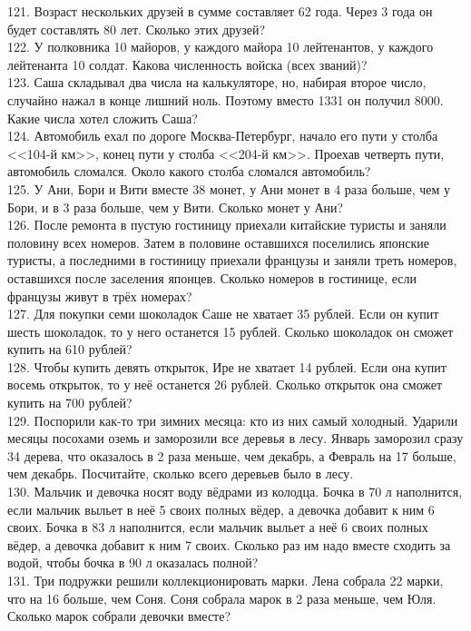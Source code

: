121. Возраст нескольких друзей в сумме составляет 62 года. Через 3 года он будет составлять 80 лет. Сколько этих друзей?\\
122. У полковника 10 майоров, у каждого майора 10 лейтенантов, у каждого лейтенанта 10 солдат. Какова численность войска (всех званий)?\\
123. Саша складывал два числа на калькуляторе, но, набирая второе число, случайно нажал в конце лишний ноль. Поэтому вместо 1331 он получил 8000. Какие числа хотел сложить Саша?\\
124. Автомобиль ехал по дороге Москва-Петербург, начало его пути у столба <<104-й км>>, конец пути у столба <<204-й км>>. Проехав четверть пути, автомобиль сломался. Около какого столба сломался автомобиль?\\
125. У Ани, Бори и Вити вместе 38 монет, у Ани монет в 4 раза больше, чем у Бори, и в 3 раза больше, чем у Вити. Сколько монет у Ани?\\
126. После ремонта в пустую гостиницу приехали китайские туристы и заняли половину всех номеров. Затем в половине оставшихся поселились японские туристы, а последними в гостиницу приехали французы и заняли треть номеров, оставшихся после заселения японцев. Сколько номеров в гостинице, если французы живут в трёх номерах?\\
127. Для покупки семи шоколадок Саше не хватает 35 рублей. Если он купит шесть шоколадок, то у него останется 15 рублей. Сколько шоколадок он сможет купить на 610 рублей?\\
128. Чтобы купить девять открыток, Ире не хватает 14 рублей. Если она купит восемь открыток, то у неё останется 26 рублей. Сколько открыток она сможет купить на 700 рублей?\\
129. Поспорили как-то три зимних месяца: кто из них самый холодный. Ударили месяцы посохами оземь и заморозили все деревья в лесу. Январь заморозил сразу 34 дерева, что оказалось в 2 раза меньше, чем декабрь, а Февраль на 17 больше, чем декабрь. Посчитайте, сколько всего деревьев было в лесу.\\
130. Мальчик и девочка носят воду вёдрами из колодца. Бочка в 70 л наполнится, если мальчик выльет в неё 5 своих полных вёдер, а девочка добавит к ним 6 своих.
Бочка в 83 л наполнится, если мальчик выльет а неё 6 своих полных вёдер, а девочка добавит к ним 7 своих. Сколько раз им надо вместе сходить за водой, чтобы бочка в 90 л оказалась полной?\\
131. Три подружки решили коллекционировать марки. Лена собрала 22 марки, что на 16 больше, чем Соня. Соня собрала марок в 2 раза меньше, чем Юля. Сколько марок собрали девочки вместе?\\

